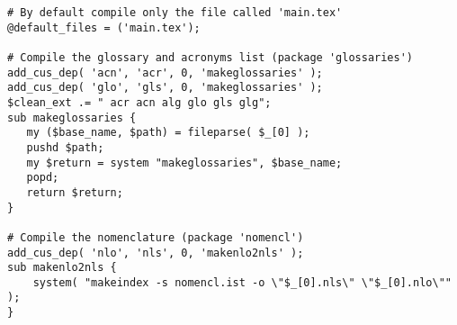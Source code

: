 \begin{lstlisting}
# By default compile only the file called 'main.tex'
@default_files = ('main.tex');

# Compile the glossary and acronyms list (package 'glossaries')
add_cus_dep( 'acn', 'acr', 0, 'makeglossaries' );
add_cus_dep( 'glo', 'gls', 0, 'makeglossaries' );
$clean_ext .= " acr acn alg glo gls glg";
sub makeglossaries {
   my ($base_name, $path) = fileparse( $_[0] );
   pushd $path;
   my $return = system "makeglossaries", $base_name;
   popd;
   return $return;
}

# Compile the nomenclature (package 'nomencl')
add_cus_dep( 'nlo', 'nls', 0, 'makenlo2nls' );
sub makenlo2nls {
    system( "makeindex -s nomencl.ist -o \"$_[0].nls\" \"$_[0].nlo\"" );
}
\end{lstlisting}
